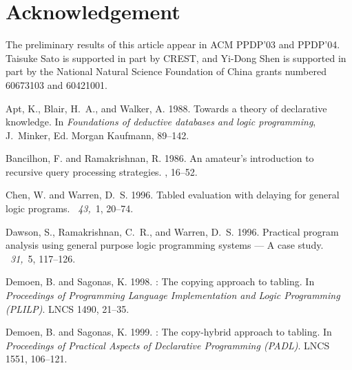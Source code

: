 \documentclass{tlp}
\begin{document}
\section{Acknowledgement}
The preliminary results of this article appear in ACM PPDP'03 and PPDP'04. Taisuke Sato is supported in part by CREST, and Yi-Dong Shen is supported in part by the National Natural Science Foundation of China grants numbered 60673103 and 60421001. 

\begin{thebibliography}{}

{\sc Apt, K.}, {\sc Blair, H.~A.}, {\sc and} {\sc Walker, A.} 1988.
\newblock Towards a theory of declarative knowledge.
\newblock In {\em Foundations of deductive databases and logic programming},
  {J.~Minker}, Ed. {Morgan Kaufmann}, 89--142.

{\sc Bancilhon, F.} {\sc and} {\sc Ramakrishnan, R.} 1986.
\newblock An amateur's introduction to recursive query processing strategies.
, 16--52.

{\sc Chen, W.} {\sc and} {\sc Warren, D.~S.} 1996.
\newblock Tabled evaluation with delaying for general logic programs.
~{\em 43,\/}~1, 20--74.

{\sc Dawson, S.}, {\sc Ramakrishnan, C.~R.}, {\sc and} {\sc Warren, D.~S.}
  1996.
\newblock Practical program analysis using general purpose logic programming
  systems --- {A} case study.
~{\em 31,\/}~5, 117--126.

{\sc Demoen, B.} {\sc and} {\sc Sagonas, K.} 1998.
: The copying approach to tabling.
\newblock In {\em Proceedings of Programming Language Implementation and Logic
  Programming (PLILP)}. LNCS 1490, 21--35.

{\sc Demoen, B.} {\sc and} {\sc Sagonas, K.} 1999.
: The copy-hybrid approach to tabling.
\newblock In {\em Proceedings of Practical Aspects of Declarative Programming
  (PADL)}. LNCS 1551, 106--121.


\end{thebibliography}
\end{document}
